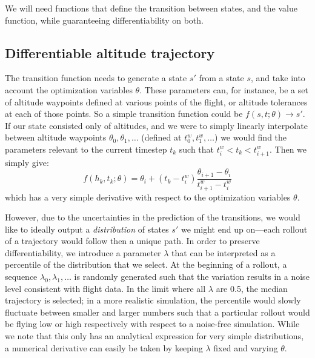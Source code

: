 \documentclass[11pt]{scrartcl} %
\begin{document}
We will need functions that define the transition between states, and the value function, while guaranteeing differentiability on both. 

\subsection{Differentiable altitude trajectory}
The transition function needs to generate a state $s'$ from a state $s$, and take into account the optimization variables $\theta$. These parameters can, for instance, be a set of altitude waypoints defined at various points of the flight, or altitude tolerances at each of those points. So a simple transition function could be $f(s, t; \theta) \to s'$. If our state consisted only of altitudes, and we were to simply linearly interpolate between altitude waypoints $\theta_0, \theta_1, \dots$ (defined at $t^w_0, t^w_1, \dots$) we would find the parameters relevant to the current timestep $t_k$ such that $t^w_i < t_k < t^w_{i+1}$. Then we simply give:
\[f(h_k, t_k; \theta) = \theta_i + (t_k - t_i^w) \frac{\theta_{i+1}-\theta_i}{t_{i+1}^w - t^w_i}\]
which has a very simple derivative with respect to the optimization variables $\theta$.

However, due to the uncertainties in the prediction of the transitions, we would like to ideally output a \emph{distribution} of states $s'$ we might end up on---each rollout of a trajectory would follow then a unique path. In order to preserve differentiability, we introduce a parameter $\lambda$ that can be interpreted as a percentile of the distribution that we select. At the beginning of a rollout, a sequence $\lambda_0, \lambda_1, \dots$ is randomly generated such that the variation results in a noise level consistent with flight data. In the limit where all $\lambda$ are 0.5, the median trajectory is selected; in a more realistic simulation, the percentile would slowly fluctuate between smaller and larger numbers such that a particular rollout would be flying low or high respectively with respect to a noise-free simulation. While we note that this only has an analytical expression for very simple distributions, a numerical derivative can easily be taken by keeping $\lambda$ fixed and varying $\theta$.
\end{document}
